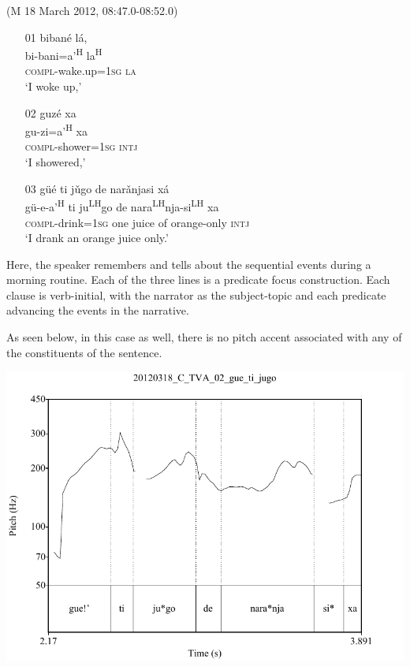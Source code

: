 \ea\label{guetijugo} (M 18 March 2012, 08:47.0-08:52.0)
\begin{itemize}
\item [01]
\glll biban\'{e} l\'{a}, \\
bi-bani=a'\textsuperscript{H} la\textsuperscript{H} \\
\textsc{compl}-wake.up=\textsc{1sg} \textsc{la} \\
\glt `I woke up,' 


\item [02]
\glll guz\'{e} xa \\
gu-zi=a'\textsuperscript{H} xa \\
\textsc{compl}-shower=\textsc{1sg} \textsc{intj} \\
\glt `I showered,' 


\item [03]
\glll g\"{u}\'{e} ti j\v{u}go de nar\v{a}njasi x\'{a} \\
g\"{u}-e-a'\textsuperscript{H} ti ju\textsuperscript{LH}go de nara\textsuperscript{LH}nja-si\textsuperscript{LH} xa \\
\textsc{compl}-drink=\textsc{1sg} one juice of orange-only \textsc{intj} \\
\glt `I drank an orange juice only.'

\end{itemize}
\z
Here, the speaker remembers and tells about the sequential events during a morning routine. Each of the three lines is a predicate focus construction. Each clause is verb-initial, with the narrator as the subject-topic and each predicate advancing the events in the narrative. 

As seen below, in this case as well, there is no pitch accent associated with any of the constituents of the sentence. 

\vspace{3mm}

\includegraphics[height=.4\textheight]{guetijugo}

